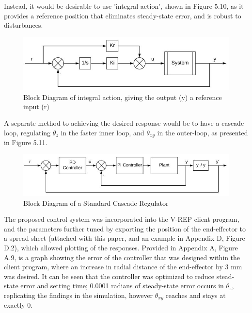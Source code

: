 \documentclass[12pt,openany,a4paper]{book}
\begin{document}
Instead, it would be desirable to use 'integral action', shown in Figure 5.10, as it provides a reference position that eliminates steady-state error, and is robust to disturbances.

\begin{center}
\begin{figure}[htb]
  \includegraphics[width=1\linewidth]{control_system_integral_action.jpg}
\caption{Block Diagram of integral action, giving the output (y) a reference input (r)}
\end{figure}
\end{center}


A separate method to achieving the desired response would be to have a cascade loop, regulating $\theta_z$ in the faster inner loop, and $\theta_{xy}$ in the outer-loop, as presented in Figure 5.11.

\begin{center}
\begin{figure}[htb]
  \includegraphics[width=1\linewidth]{control_system_cascade.jpg}
\caption{Block Diagram of a Standard Cascade Regulator}
\end{figure}
\end{center}

The proposed control system was incorporated into the V-REP client program, and the parameters further tuned by exporting the position of the end-effector to a spread sheet (attached with this paper, and an example in Appendix D, Figure D.2), which allowed plotting of the responses. Provided in Appendix A, Figure A.9, is a graph showing the error of the controller that was designed within the client program, where an increase in radial distance of the end-effector by 3 mm was desired. It can be seen that the controller was optimized to reduce stead-state error and setting time; 0.0001 radians of steady-state error occurs in $\theta_z$, replicating the findings in the simulation, however $\theta_{xy}$ reaches and stays at exactly 0. 
\end{document}
